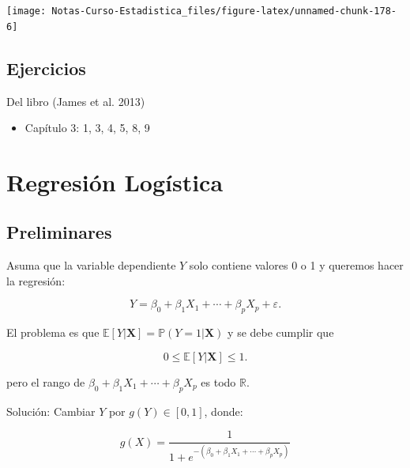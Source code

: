 \documentclass[
  12pt,
]{book}
\providecommand{\tightlist}{%
  \setlength{\itemsep}{0pt}\setlength{\parskip}{0pt}}
\begin{document}
\begin{center}\texttt{[image: Notas-Curso-Estadistica\_files/figure-latex/unnamed-chunk-178-6]} \end{center}

\hypertarget{ejercicios-2}{%
\section{Ejercicios}\label{ejercicios-2}}

Del libro (James et al. 2013)

\begin{itemize}
\tightlist
\item
  Capítulo 3: 1, 3, 4, 5, 8, 9
\end{itemize}

\hypertarget{regresiuxf3n-loguxedstica}{%
\chapter{Regresión Logística}\label{regresiuxf3n-loguxedstica}}

\hypertarget{preliminares}{%
\section{Preliminares}\label{preliminares}}

Asuma que la variable dependiente \(Y\) solo contiene valores 0 o 1 y
queremos hacer la regresión:

\begin{equation*}
Y = \beta_{0} +\beta_{1} X_{1} + \cdots + \beta_{p} X_{p} + \varepsilon.
\end{equation*}

El problema es que
\(\mathbb{E}\left[Y | \boldsymbol{X}\right] = \mathbb{P}\left(Y=1\vert \boldsymbol{X}\right)\)
y se debe cumplir que

\begin{equation*}
0\leq \mathbb{E}\left[Y | \boldsymbol{X}\right]\leq 1.
\end{equation*}

pero el rango de
\(\beta_{0} +\beta_{1} X_{1} + \cdots + \beta_{p} X_{p}\) es todo
\(\mathbb{R}\).

Solución: Cambiar \(Y\) por \(g(Y)\in [0,1]\), donde:

\begin{equation*}
g(X) = \frac{1}{1+e^{-(\beta_{0} +\beta_{1} X_{1} + \cdots + \beta_{p} X_{p})}}
\end{equation*}
\end{document}
